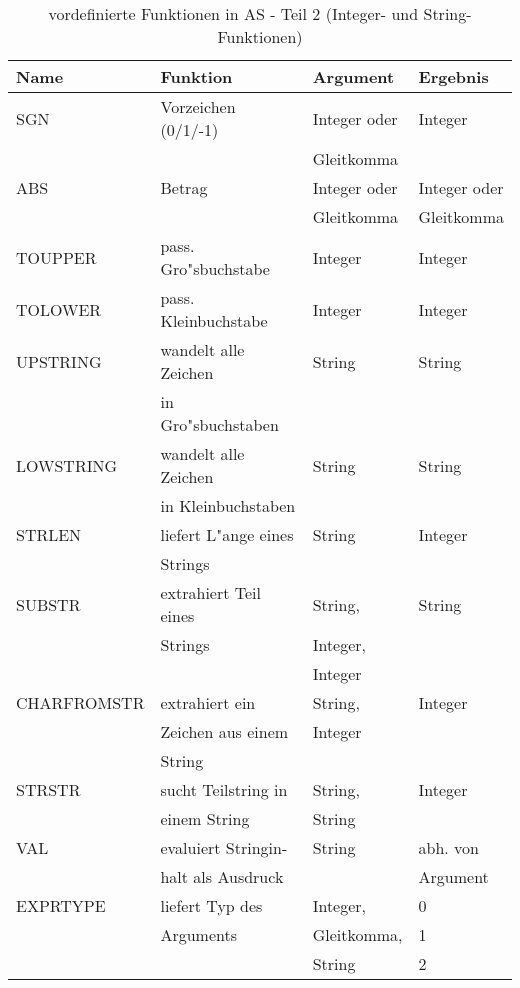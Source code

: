 \documentclass[12pt,a4paper,twoside]{report}
\begin{document}
\begin{table*}[htb]
\begin{center}\begin{tabular}{|l|l|l|l|}
\hline
Name     & Funktion             & Argument & Ergebnis \\
\hline
\hline
SGN         & Vorzeichen (0/1/-1)   & Integer oder & Integer \\
            &                       & Gleitkomma   & \\
ABS         & Betrag                & Integer oder & Integer oder \\
            &                       & Gleitkomma   & Gleitkomma \\
TOUPPER     & pass. Gro"sbuchstabe  & Integer      & Integer \\
TOLOWER     & pass. Kleinbuchstabe  & Integer      & Integer \\
UPSTRING    & wandelt alle Zeichen  & String       & String \\
            & in Gro"sbuchstaben    &              & \\
LOWSTRING   & wandelt alle Zeichen  & String       & String \\
            & in Kleinbuchstaben    &              & \\
STRLEN      & liefert L"ange eines  & String       & Integer \\
            & Strings               &              & \\
SUBSTR      & extrahiert Teil eines & String,      & String \\
            & Strings               & Integer,     & \\
            &                       & Integer      & \\
CHARFROMSTR & extrahiert ein        & String,      & Integer \\
            & Zeichen aus einem     & Integer      & \\
            & String                &              & \\
STRSTR      & sucht Teilstring in   & String,      & Integer \\
            & einem String          & String       & \\
VAL         & evaluiert Stringin-   & String       & abh. von \\
            & halt als Ausdruck     &              & Argument \\
EXPRTYPE    & liefert Typ des       & Integer,     & 0 \\
            & Arguments             & Gleitkomma,  & 1 \\
            &                       & String       & 2 \\
\hline
\end{tabular}\end{center}
\caption{vordefinierte Funktionen in AS - Teil 2
         (Integer- und String-Funk\-tio\-nen)\label{TabFuncs2}}
\end{table*}
\end{document}
